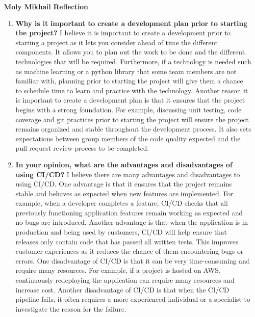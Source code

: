 \documentclass{article}
\begin{document}
\begin{enumerate}
\textbf{Moly Mikhail Reflection}
\begin{enumerate}
    \item  \textbf{Why is it important to create a development plan prior to starting the
    project?} \newline
    I believe it is important to create a development prior to starting a project as it lets you consider ahead of time the different 
    components. It allows you to plan out the work to be done and the different technologies that will be required. Furthermore, if a technology 
    is needed such as machine learning or a python library that some team members are not familiar with, planning prior to starting the project will give
    them a chance to schedule time to learn and practice with the technology. Another reason it is important to create a development plan is that it ensures that the project begins with a strong foundation.
    For example, discussing unit testing, code coverage and git practices prior to starting the project will ensure the project remains organized and stable throughout the development process. It also sets 
    expectations between group members of the code quality expected and the pull request review process to be completed.
    
    \item \textbf{In your opinion, what are the advantages and disadvantages of using
    CI/CD?} \newline
    I believe there are many advantages and disadvantages to using CI/CD. One advantage is that it ensures that the project remains stable and behaves as expected when new features are implemented. 
    For example, when a developer completes a feature, CI/CD checks that all previously functioning application features remain working as expected and no bugs are introduced. Another advantage
    is that when the application is in production and being used by customers, CI/CD will help ensure that releases only contain code that has passed all written tests.  This improves customer experiences
    as it reduces the chance of them encountering bugs or errors.  
    One disadvantage of CI/CD is that it can be very time-consuming and require many resources. For example, if a project is hosted on AWS, continuously redeploying the application
    can require many resources and increase cost. Another disadvantage of CI/CD is that when the CI/CD pipeline fails, it often requires a more 
    experienced individual or a specialist to investigate the reason for the failure.


\end{enumerate}
\end{enumerate}
\end{document}
